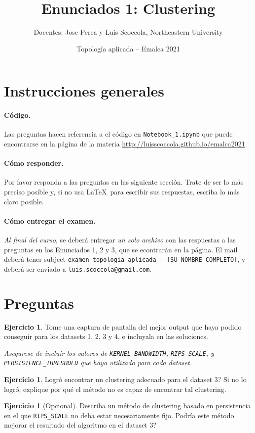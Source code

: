 \documentclass[12pt,reqno,oneside]{article}
\title{Enunciados 1: Clustering}
\date{Topolog\'{i}a aplicada -- Emalca 2021 }
\author{Docentes: Jose Perea y Luis Scoccola, Northeastern University}
\DeclareRobustCommand\squelch[1]{%
    \BeginAccSupp{method=plain,ActualText={}}#1\EndAccSupp{}}
\theoremstyle{definition}
\newtheorem{pregunta}[theorem]{Ejercicio}
\begin{document}
\maketitle

\section{Instrucciones generales}
%
\paragraph{C\'odigo.}
Las preguntas hacen referencia a el c\'odigo en \texttt{Notebook\_1.ipynb} que puede encontrarse en la p\'agina de la materia
\url{http://luisscoccola.github.io/emalca2021}.

\paragraph{C\'omo responder.}
Por favor responda a las preguntas en las siguiente secci\'on. 
Trate de ser lo m\'as preciso posible y, si no usa \LaTeX~para escribir sus respuestas, escriba lo m\'as claro posible.

\paragraph{C\'omo entregar el examen.}
\textit{Al final del curso}, se deber\'a entregar \textit{un solo archivo} con las respuestas a las preguntas en los Enunciados 1, 2 y 3, que se econtrar\'an en la p\'agina.
El mail deber\'a tener subject \texttt{examen topologia aplicada -- [SU NOMBRE COMPLETO]}, y deber\'a ser enviado a \squelch{\texttt{luis.scoccola@gmail.com}}.

\section{Preguntas}
\begin{pregunta}
	Tome una captura de pantalla del mejor output que haya podido conseguir para los datasets 1, 2, 3 y 4, e incluyala en las soluciones.

	\noindent
	\textit{Asegurese de incluir los valores de \texttt{KERNEL\_BANDWIDTH}, \texttt{RIPS\_SCALE}, y \texttt{PERSISTENCE\_THRESHOLD} que haya utilizado para cada dataset.}
\end{pregunta}

\begin{pregunta}
	Logr\'o encontrar un clustering adecuado para el dataset 3?
	Si no lo logr\'o, explique por qu\'e el m\'etodo no es capaz de encontrar tal clustering.
\end{pregunta}

\begin{pregunta}[Opcional]
	Describa un m\'etodo de clustering basado en persistencia en el que \texttt{RIPS\_SCALE} no deba estar necesariamente fijo.
	Podr\'ia este m\'etodo mejorar el resultado del algoritmo en el dataset 3?
\end{pregunta}
\end{document}
